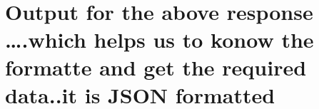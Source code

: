 \documentclass[11pt]{article}
\begin{document}
    \begin{center}
    \end{center}
    { \hspace*{\fill} \\}
    
    \hypertarget{output-for-the-above-response-.which-helps-us-to-konow-the-formatte-and-get-the-required-data..it-is-json-formatted}{%
\section{Output for the above response \ldots.which helps us to konow
the formatte and get the required data..it is JSON
formatted💪🏻}\label{output-for-the-above-response-.which-helps-us-to-konow-the-formatte-and-get-the-required-data..it-is-json-formatted}}
\end{document}

